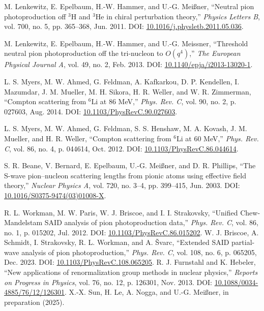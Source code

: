 \documentclass[a4paper,11pt]{article}
\begin{document}
\begin{thebibliography}{99}
M. Lenkewitz, E. Epelbaum, H.-W. Hammer, and U.-G. Meißner,
``Neutral pion photoproduction off $^3$H and $^3$He in chiral
perturbation theory,'' \textit{Physics Letters B}, vol. 700, no. 5,
pp. 365–368, Jun. 2011. DOI:
\href{http://dx.doi.org/10.1016/j.physletb.2011.05.036}{10.1016/j.physletb.2011.05.036}.

M. Lenkewitz, E. Epelbaum, H.-W. Hammer, and U.-G. Meissner,
``Threshold neutral pion photoproduction off the tri-nucleon to
$O(q^4)$,'' \textit{The European Physical Journal A}, vol. 49, no.
2, Feb. 2013. DOI:
\href{http://dx.doi.org/10.1140/epja/i2013-13020-1}{10.1140/epja/i2013-13020-1}.

L. S. Myers, M. W. Ahmed, G. Feldman, A. Kafkarkou, D. P.
Kendellen, I. Mazumdar, J. M. Mueller, M. H. Sikora, H. R. Weller,
and W. R. Zimmerman, ``Compton scattering from $^{6}\mathrm{Li}$ at
86 MeV,'' \textit{Phys. Rev. C}, vol. 90, no. 2, p. 027603, Aug.
2014. DOI:
\href{https://link.aps.org/doi/10.1103/PhysRevC.90.027603}{10.1103/PhysRevC.90.027603}.

L. S. Myers, M. W. Ahmed, G. Feldman, S. S. Henshaw, M. A. Kovash,
J. M. Mueller, and H. R. Weller, ``Compton scattering from $^{6}$Li
at 60 MeV,'' \textit{Phys. Rev. C}, vol. 86, no. 4, p. 044614, Oct.
2012. DOI:
\href{https://link.aps.org/doi/10.1103/PhysRevC.86.044614}{10.1103/PhysRevC.86.044614}.

S. R. Beane, V. Bernard, E. Epelbaum, U.-G. Meißner, and D. R.
Phillips, ``The S-wave pion–nucleon scattering lengths from pionic
atoms using effective field theory,'' \textit{Nuclear Physics A},
vol. 720, no. 3–4, pp. 399–415, Jun. 2003. DOI:
\href{http://dx.doi.org/10.1016/S0375-9474(03)01008-X}{10.1016/S0375-9474(03)01008-X}.

R. L. Workman, M. W. Paris, W. J. Briscoe, and I. I. Strakovsky,
``Unified Chew-Mandelstam SAID analysis of pion photoproduction
data,'' \textit{Phys. Rev. C}, vol. 86, no. 1, p. 015202, Jul.
2012. DOI:
\href{https://link.aps.org/doi/10.1103/PhysRevC.86.015202}{10.1103/PhysRevC.86.015202}.
W. J. Briscoe, A. Schmidt, I. Strakovsky, R. L. Workman, and A.
\ifmmode {}\else \v{S}\fi{}varc, ``Extended SAID
partial-wave analysis of pion photoproduction,'' \textit{Phys. Rev.
C}, vol. 108, no. 6, p. 065205, Dec. 2023. DOI:
\href{https://link.aps.org/doi/10.1103/PhysRevC.108.065205}{10.1103/PhysRevC.108.065205}.
R. J. Furnstahl and K. Hebeler, ``New applications of
renormalization group methods in nuclear physics,'' \textit{Reports
on Progress in Physics}, vol. 76, no. 12, p. 126301, Nov. 2013.
DOI:
\href{http://dx.doi.org/10.1088/0034-4885/76/12/126301}{10.1088/0034-4885/76/12/126301}.
X.-X. Sun, H. Le, A. Nogga, and U.-G. Meißner, in preparation (2025).


\end{thebibliography}
\end{document}
